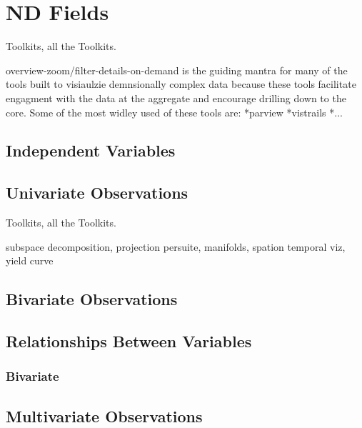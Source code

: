 \documentclass[../main.tex]{subfiles}
\begin{document}
\section{ND Fields}
Toolkits, all the Toolkits.

overview-zoom/filter-details-on-demand is the guiding mantra for many of the
tools built to visiaulzie demnsionally complex data \cite{shneiderman1996eyes}
because these tools facilitate engagment with the data at the aggregate and
encourage drilling down to the core. Some of the most widley used of these
tools are:
*parview
*vistrails
*...


\subsection{Independent Variables}
\subsection{Univariate Observations}
Toolkits, all the Toolkits.




subspace decomposition, projection persuite, manifolds,
spation temporal viz, yield curve
\subsection{Bivariate Observations}


\subsection{Relationships Between Variables}
\subsubsection{Bivariate}
\subsection{Multivariate Observations}
\end{document}
